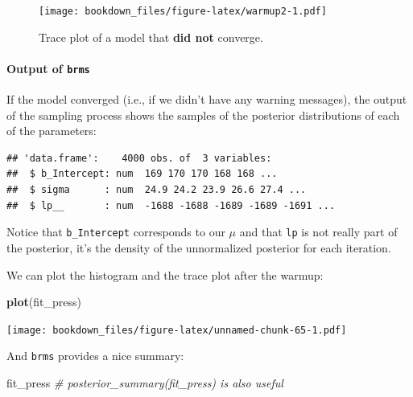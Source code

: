\documentclass[12pt,]{krantz}
\newenvironment{Shaded}{\begin{snugshade}}{\end{snugshade}}
\newcommand{\CommentTok}[1]{\textcolor[rgb]{0.56,0.35,0.01}{\textit{#1}}}
\newcommand{\KeywordTok}[1]{\textcolor[rgb]{0.13,0.29,0.53}{\textbf{#1}}}
\newcommand{\NormalTok}[1]{#1}
\newcommand{\OperatorTok}[1]{\textcolor[rgb]{0.81,0.36,0.00}{\textbf{#1}}}
\newcommand{\StringTok}[1]{\textcolor[rgb]{0.31,0.60,0.02}{#1}}
\let\oldparagraph\paragraph
\renewcommand{\paragraph}[1]{\oldparagraph{#1}\mbox{}}
\theoremstyle{definition}
\theoremstyle{definition}
\theoremstyle{definition}
\theoremstyle{remark}
\begin{document}
\begin{figure}
\centering
\texttt{[image: bookdown\_files/figure-latex/warmup2-1.pdf]}
\caption{\label{fig:warmup2}Trace plot of a model that \textbf{did not} converge.}
\end{figure}

\hypertarget{output-of-brms}{%
\paragraph{\texorpdfstring{Output of \texttt{brms}}{Output of brms}}\label{output-of-brms}}

If the model converged (i.e., if we didn't have any warning messages), the output of the sampling process shows the samples of the posterior distributions of each of the parameters:

\begin{Shaded}
\end{Shaded}

\begin{verbatim}
## 'data.frame':    4000 obs. of  3 variables:
##  $ b_Intercept: num  169 170 170 168 168 ...
##  $ sigma      : num  24.9 24.2 23.9 26.6 27.4 ...
##  $ lp__       : num  -1688 -1688 -1689 -1689 -1691 ...
\end{verbatim}

Notice that \texttt{b\_Intercept} corresponds to our \(\mu\) and that \texttt{lp} is not really part of the posterior, it's the density of the unnormalized posterior for each iteration.

We can plot the histogram and the trace plot after the warmup:

\begin{Shaded}
\begin{Highlighting}[]
\KeywordTok{plot}\NormalTok{(fit_press)}
\end{Highlighting}
\end{Shaded}

\texttt{[image: bookdown\_files/figure-latex/unnamed-chunk-65-1.pdf]}

And \texttt{brms} provides a nice summary:

\begin{Shaded}
\begin{Highlighting}[]
\NormalTok{fit_press}
\CommentTok{# posterior_summary(fit_press) is also useful}
\end{Highlighting}
\end{Shaded}
\end{document}
